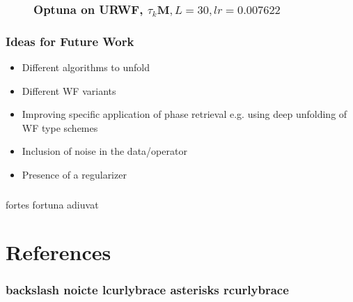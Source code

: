 \documentclass{beamer}
\theoremstyle{definition}
\theoremstyle{remark}
\begin{document}
\begin{frame}
  \begin{figure}
    \frametitle{Optuna on URWF, $\tau_k\boldsymbol{M},L=30,lr=0.007622$}
    \centering
    \resizebox{0.9\textwidth}{!}{}
    \label{fig:urwf_optuna}
  \end{figure}
\end{frame}

\begin{frame}
  \frametitle{Ideas for Future Work}
  \begin{itemize}
      \pause
      \item Different algorithms to unfold \cite{Monga2019}
      \pause
      \item Different \ac{WF} variants \cite{Jaganathan2015}\cite{Liu2019}\cite{Chandra2017}
      \pause
      \item Improving specific application of phase retrieval e.g. \cite{Fogel2013} using deep unfolding of \ac{WF} type schemes
      \pause
      \item Inclusion of noise in the data/operator
      \pause
      \item Presence of a regularizer
  \end{itemize}
\end{frame}

\begin{frame}
  \frametitle{}
  \pause
  \begin{center}
    \Huge{fortes fortuna adiuvat}  
  \end{center}
\end{frame}
\section[References]{References}
  \begin{frame}[allowframebreaks]
  \frametitle{backslash noicte lcurlybrace asterisks rcurlybrace}
  \nocite{*}
  \printbibliography 
  \end{frame}
  
\end{document}
